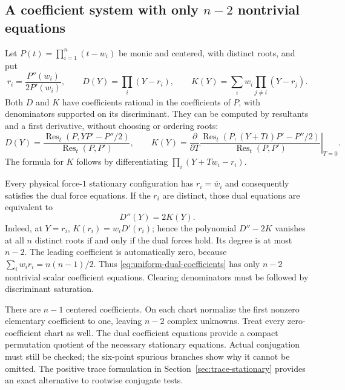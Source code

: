 \documentclass[11pt]{article}
\theoremstyle{remark}
\numberwithin{equation}{section}
\begin{document}
\subsection{A coefficient system with only \texorpdfstring{$n-2$}{n-2} nontrivial equations}
Let $P(t)=\prod_{i=1}^n(t-w_i)$ be monic and centered, with distinct
roots, and put
\[
 r_i=\frac{P''(w_i)}{2P'(w_i)},\qquad
 D(Y)=\prod_i(Y-r_i),\qquad
 K(Y)=\sum_i w_i\prod_{j\ne i}(Y-r_j).
\]
Both $D$ and $K$ have coefficients rational in the coefficients of $P$,
with denominators supported on its discriminant.  They can be computed
by resultants and a first derivative, without choosing or ordering roots:
\[
 D(Y)=\frac{\operatorname{Res}_t(P,YP'-P''/2)}
                  {\operatorname{Res}_t(P,P')},\qquad
 K(Y)=\left.\frac{\partial}{\partial T}
 \frac{\operatorname{Res}_t(P,(Y+Tt)P'-P''/2)}
      {\operatorname{Res}_t(P,P')}\right|_{T=0}.
\]
The formula for $K$ follows by differentiating
$\prod_i(Y+Tw_i-r_i)$.

Every physical force-$1$ stationary configuration has $r_i=\overline
w_i$ and consequently satisfies the dual force equations.  If the
$r_i$ are distinct, those dual equations are equivalent to
\begin{equation}\label{eq:uniform-dual-coefficients}
                 D''(Y)=2K(Y).
\end{equation}
Indeed, at $Y=r_i$, $K(r_i)=w_iD'(r_i)$; hence the polynomial
$D''-2K$ vanishes at all $n$ distinct roots if and only if the dual
forces hold.  Its degree is at most $n-2$.
The leading coefficient is automatically zero, because
$\sum_i w_ir_i=n(n-1)/2$.  Thus \eqref{eq:uniform-dual-coefficients}
has only $n-2$ nontrivial scalar coefficient equations.  Clearing
denominators must be followed by discriminant saturation.

There are $n-1$ centered coefficients.  On each chart normalize the
first nonzero elementary coefficient to one, leaving $n-2$ complex
unknowns.  Treat every zero-coefficient chart as well.  The dual
coefficient equations provide a compact permutation quotient of the
necessary stationary equations.  Actual conjugation must still be
checked; the six-point spurious branches show why it cannot be omitted.
The positive trace formulation in Section~\ref{sec:trace-stationary}
provides an exact alternative to rootwise conjugate tests.
\end{document}

